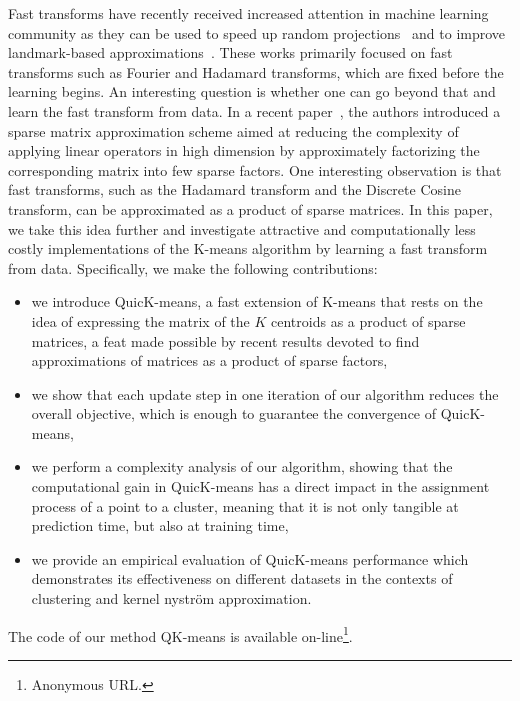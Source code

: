 Fast transforms have recently received increased attention in machine learning community as they can be used  to speed up random projections~\cite{le2013fastfood,gittens2016revisiting} and to improve landmark-based approximations~\cite{si2016computationally}.
%
These works primarily focused on fast transforms such as Fourier and Hadamard transforms, which are fixed before the learning begins. An interesting question is whether one can go beyond that and learn the fast transform from data. 
%
In a recent paper~\cite{LeMagoarou2016Flexible}, the authors introduced a sparse matrix approximation scheme aimed  at  reducing the  complexity  of  applying  linear  operators  in  high  dimension by   approximately   factorizing   the   corresponding   matrix   into few   sparse   factors. One interesting observation is that fast transforms, such as the  Hadamard  transform  and  the  Discrete  Cosine  transform, can be approximated as a product of sparse matrices.
%
In this paper, we take this idea further and investigate attractive and computationally less costly implementations of the K-means algorithm by learning a fast transform from data.
%
Specifically, we make the following contributions:
\begin{itemize}
	\item we introduce QuicK-means, a fast extension of K-means that rests on the idea of expressing the matrix of the $K$ centroids as a product of sparse matrices, a feat made possible by recent results devoted to find approximations of matrices as a product of sparse factors,
	\item we show that each update step in one iteration of our algorithm  reduces the overall objective, which is enough to guarantee the convergence of QuicK-means,
	\item we perform a complexity analysis of our algorithm, showing that the computational gain in QuicK-means  has a direct impact in the assignment process of a point to a cluster, meaning that it is not only tangible at prediction time, but also at training time,
	\item we provide an empirical evaluation of QuicK-means  performance which demonstrates its effectiveness on different datasets in the contexts of clustering and kernel nystr\"om approximation.
\end{itemize}

The code of our method QK-means is available on-line\footnote{Anonymous URL.}.




